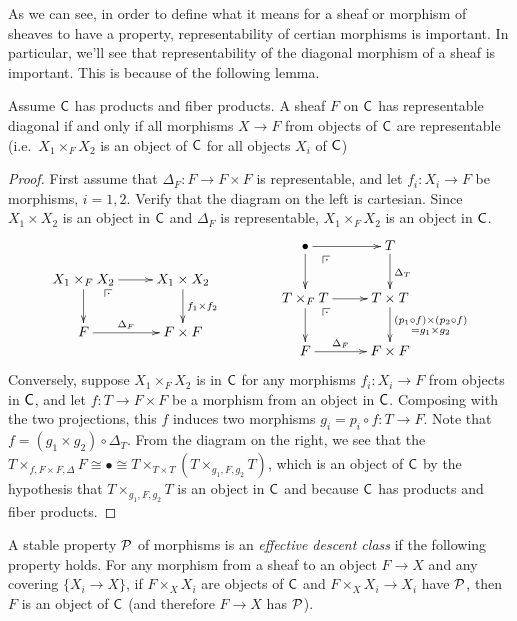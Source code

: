 As we can see, in order to define what it means for a sheaf or morphism of sheaves to have a property, representability of certian morphisms is important. In particular, we'll see that representability of the diagonal morphism of a sheaf is important. This is because of the following lemma.
\begin{lemma}\label{lec12L:prod_schemes_over_alg_space}
 Assume $\C$ has products and fiber products. A sheaf $F$ on $\C$ has representable diagonal if and only if all morphisms $X\to F$ from objects of $\C$ are representable (i.e.~$X_1\times_F X_2$ is an object of $\C$ for all objects $X_i$ of $\C$)
\end{lemma}
\begin{proof}
 First assume that $\Delta_F\colon F\to F\times F$ is representable, and let $f_i\colon X_i\to F$ be morphisms, $i=1,2$. Verify that the diagram on the left is cartesian. Since $X_1\times X_2$ is an object in $\C$ and $\Delta_F$ is representable, $X_1\times_F X_2$ is an object in $\C$.
  \[\xymatrix{
  X_1\times_F X_2 \ar[r] \ar[d] \ar@{}[dr]|(.25)\pb & X_1\times X_2 \ar[d]^{f_1\times f_2}\\
  F\ar[r]^-{\Delta_F} &F\times F
 }\qquad\qquad
 \raisebox{2pc}{$\xymatrix{
  \bullet \ar@{}[dr]|(.25)\pb \ar[r] \ar[d]& T \ar[d]^{\Delta_T}\\
  T\times_F T \ar[r] \ar[d] \ar@{}[dr]|(.25)\pb& T\times T \ar[d]^{\substack{(p_1\circ f)\times(p_2\circ f)\\ = g_1\times g_2}}\\
  F\ar[r]^-{\Delta_F} & F\times F
 }$}\]
 Conversely, suppose $X_1\times_F X_2$ is in $\C$ for any morphisms $f_i\colon X_i\to F$ from objects in $\C$, and let $f\colon T\to F\times F$ be a morphism from an object in $\C$. Composing with the two projections, this $f$ induces two morphisms $g_i=p_i\circ f\colon T\to F$. Note that $f=(g_1\times g_2)\circ \Delta_T$. From the diagram on the right, we see that the $T\times_{f,F\times F,\Delta} F\cong \bullet \cong T\times_{T\times T}(T\times_{g_1,F,g_2} T)$, which is an object of $\C$ by the hypothesis that $T\times_{g_1,F,g_2} T$ is an object in $\C$ and because $\C$ has products and fiber products.
\end{proof}

\begin{definition}
 A stable property $\P$ of morphisms is an \emph{effective descent class} if the following property holds. For any morphism from a sheaf to an object $F\to X$ and any covering $\{X_i\to X\}$, if $F\times_X X_i$ are objects of $\C$ and $F\times_X X_i\to X_i$ have $\P$, then $F$ is an object of $\C$ (and therefore $F\to X$ has $\P$).
\end{definition}

